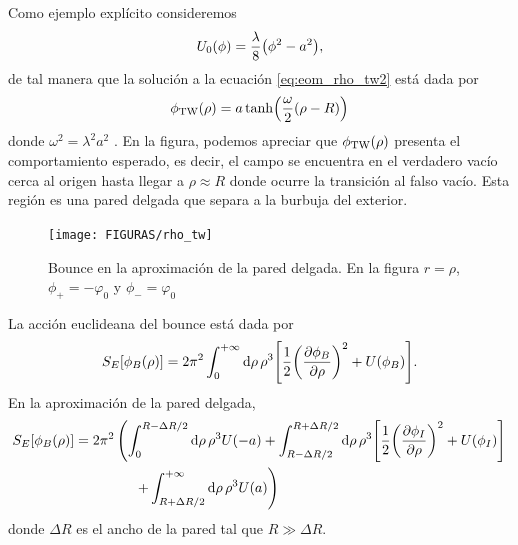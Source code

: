 Como ejemplo explícito consideremos
\begin{equation}
U_0\qty(\phi) = \frac{\lambda}{8}\qty(\phi^2 - a^2),
\end{equation}
de tal manera que la solución a la ecuación \eqref{eq:eom_rho_tw2} está dada por
\begin{equation}
\phi_{\text{TW}}\qty(\rho) = a\tanh(\frac{\omega}{2}\qty(\rho - R))
\end{equation}
donde $\omega^2 = \lambda^2 a^2$ \cite{das2006field}. En la figura, podemos apreciar que $\phi_{\text{TW}}\qty(\rho)$ presenta el comportamiento esperado, es decir, el campo se encuentra en el verdadero vacío cerca al origen hasta llegar a $\rho \approx R$ donde ocurre la transición al falso vacío. Esta región es una pared delgada que separa a la burbuja del exterior. 
\begin{figure}[t]
	\centering
	\texttt{[image: FIGURAS/rho\_tw]}
	\caption{Bounce en la aproximación de la pared delgada. En la figura $r = \rho$, $\phi_+ = -\varphi_0$ y $\phi_- = \varphi_0$ \cite{rubakov2009classical}}
	\label{fig:rhotw}
\end{figure}

La acción euclideana del bounce %
está dada por \cite{rubakov2009classical}
\begin{equation}
S_E\qty[\phi_B\qty(\rho)] = 2\pi^2 \int_0^{+\infty} \dd{\rho}  \rho^3 \qty[\frac{1}{2}\qty(\pdv{\phi_B}{\rho})^2 + U\qty(\phi_B)].
\end{equation}
En la aproximación de la pared delgada,
\begin{align}
S_E\qty[\phi_B\qty(\rho)] &= 2\pi^2  \left( \int_0^{R - \Delta R/2} \dd{\rho}  \rho^3 U\qty(-a) +  \int_{R - \Delta R/2}^{R+\Delta R/2} \dd{\rho}  \rho^3 \qty[\frac{1}{2}\qty(\pdv{\phi_I}{\rho})^2 + U\qty(\phi_I)] \right. \\
&\phantom{= 2\pi^2 \left( \right. } \quad  \left. + \int_{R+\Delta R/2}^{+\infty} \dd{\rho}  \rho^3 U\qty(a) \right)
\end{align}
donde $\Delta R$ es el ancho de la pared tal que $R \gg \Delta R$. 

